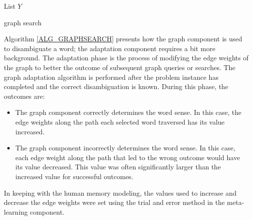 \IncMargin{1em}
\begin{algorithm}
\DontPrintSemicolon
{}
\BlankLine
	List $Y$\;

	\Return {}\;
\caption{graph search\label{ALG_GRAPHSEARCH}}
\end{algorithm}\DecMargin{1em}


Algorithm \ref{ALG_GRAPHSEARCH} presents how the graph component is used to 
disambiguate a word; the adaptation component requires a bit more background. 
The adaptation phase is the process of modifying the edge weights of the graph 
to better the outcome of subsequent graph queries or searches. The graph adaptation 
algorithm is performed after the problem instance has completed and the correct 
disambiguation is known.  During this phase, the outcomes are: 

\begin{itemize}      
	\item The graph component correctly determines the word sense. 
	In this case, the edge weights along the path each selected 
	word traversed has its value increased.
	\item The graph component incorrectly determines the word sense. 
	In this case, each edge weight along the path that led to the 
	wrong outcome would have its value decreased. This value was often significantly larger than the 
	increased value for successful outcomes.      
\end{itemize}

In keeping with the human memory modeling, the values used to increase and decrease the edge 
weights were set using the trial and error method in the meta-learning component.

